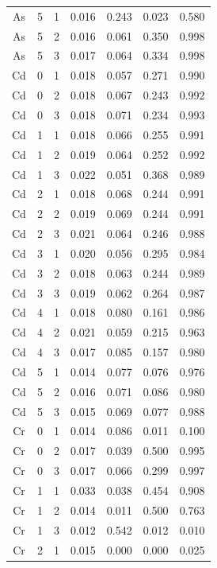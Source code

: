 \documentclass[ms, hidelinks]{uncgdissertationexp}
\theoremstyle{plain}
\theoremstyle{definition}
\theoremstyle{remark}
\begin{document}
\begin{longtable}{ccccccc}
As & 5 & 1 & 0.016 & 0.243 & 0.023 & 0.580\\
\rowcolor{gray!6}  As & 5 & 2 & 0.016 & 0.061 & 0.350 & 0.998\\
As & 5 & 3 & 0.017 & 0.064 & 0.334 & 0.998\\
\rowcolor{gray!6}  Cd & 0 & 1 & 0.018 & 0.057 & 0.271 & 0.990\\
Cd & 0 & 2 & 0.018 & 0.067 & 0.243 & 0.992\\
\rowcolor{gray!6}  Cd & 0 & 3 & 0.018 & 0.071 & 0.234 & 0.993\\
Cd & 1 & 1 & 0.018 & 0.066 & 0.255 & 0.991\\
\rowcolor{gray!6}  Cd & 1 & 2 & 0.019 & 0.064 & 0.252 & 0.992\\
Cd & 1 & 3 & 0.022 & 0.051 & 0.368 & 0.989\\
\rowcolor{gray!6}  Cd & 2 & 1 & 0.018 & 0.068 & 0.244 & 0.991\\
Cd & 2 & 2 & 0.019 & 0.069 & 0.244 & 0.991\\
\rowcolor{gray!6}  Cd & 2 & 3 & 0.021 & 0.064 & 0.246 & 0.988\\
Cd & 3 & 1 & 0.020 & 0.056 & 0.295 & 0.984\\
\rowcolor{gray!6}  Cd & 3 & 2 & 0.018 & 0.063 & 0.244 & 0.989\\
Cd & 3 & 3 & 0.019 & 0.062 & 0.264 & 0.987\\
\rowcolor{gray!6}  Cd & 4 & 1 & 0.018 & 0.080 & 0.161 & 0.986\\
Cd & 4 & 2 & 0.021 & 0.059 & 0.215 & 0.963\\
\rowcolor{gray!6}  Cd & 4 & 3 & 0.017 & 0.085 & 0.157 & 0.980\\
Cd & 5 & 1 & 0.014 & 0.077 & 0.076 & 0.976\\
\rowcolor{gray!6}  Cd & 5 & 2 & 0.016 & 0.071 & 0.086 & 0.980\\
Cd & 5 & 3 & 0.015 & 0.069 & 0.077 & 0.988\\
\rowcolor{gray!6}  Cr & 0 & 1 & 0.014 & 0.086 & 0.011 & 0.100\\
Cr & 0 & 2 & 0.017 & 0.039 & 0.500 & 0.995\\
\rowcolor{gray!6}  Cr & 0 & 3 & 0.017 & 0.066 & 0.299 & 0.997\\
Cr & 1 & 1 & 0.033 & 0.038 & 0.454 & 0.908\\
\rowcolor{gray!6}  Cr & 1 & 2 & 0.014 & 0.011 & 0.500 & 0.763\\
Cr & 1 & 3 & 0.012 & 0.542 & 0.012 & 0.010\\
\rowcolor{gray!6}  Cr & 2 & 1 & 0.015 & 0.000 & 0.000 & 0.025\\

\end{longtable}
\end{document}
